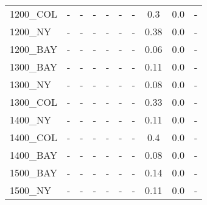 \documentclass[main.tex]{subfiles}
\begin{document}
\begin{center}
\begin{tabular}{lccccccccc}
1200\_COL & - & - 
 & - & - 
 & - & - 
 & 0.3 & 0.0 & - \\
1200\_NY & - & - 
 & - & - 
 & - & - 
 & 0.38 & 0.0 & - \\
1200\_BAY & - & - 
 & - & - 
 & - & - 
 & 0.06 & 0.0 & - \\
1300\_BAY & - & - 
 & - & - 
 & - & - 
 & 0.11 & 0.0 & - \\
1300\_NY & - & - 
 & - & - 
 & - & - 
 & 0.08 & 0.0 & - \\
1300\_COL & - & - 
 & - & - 
 & - & - 
 & 0.33 & 0.0 & - \\
1400\_NY & - & - 
 & - & - 
 & - & - 
 & 0.11 & 0.0 & - \\
1400\_COL & - & - 
 & - & - 
 & - & - 
 & 0.4 & 0.0 & - \\
1400\_BAY & - & - 
 & - & - 
 & - & - 
 & 0.08 & 0.0 & - \\
1500\_BAY & - & - 
 & - & - 
 & - & - 
 & 0.14 & 0.0 & - \\
1500\_NY & - & - 
 & - & - 
 & - & - 
 & 0.11 & 0.0 & - \\
\hline\end{tabular}
\end{center}
\newpage
\end{document}
